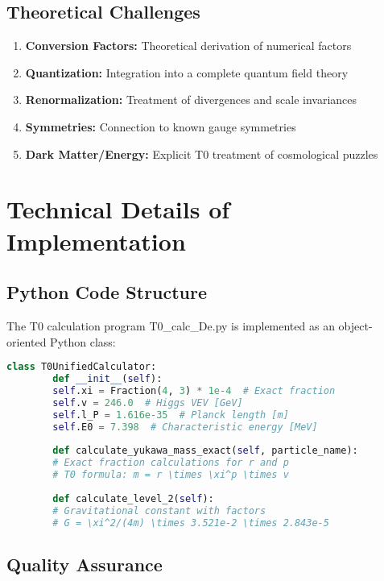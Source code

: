 \documentclass[11pt,a4paper]{article}
\begin{document}
	\subsection{Theoretical Challenges}
	
	\begin{enumerate}
		\item \textbf{Conversion Factors:} Theoretical derivation of numerical factors
		\item \textbf{Quantization:} Integration into a complete quantum field theory
		\item \textbf{Renormalization:} Treatment of divergences and scale invariances
		\item \textbf{Symmetries:} Connection to known gauge symmetries
		\item \textbf{Dark Matter/Energy:} Explicit T0 treatment of cosmological puzzles
	\end{enumerate}
	
	\section{Technical Details of Implementation}
	
	\subsection{Python Code Structure}
	
	The T0 calculation program T0\_calc\_De.py is implemented as an object-oriented Python class:
	
	\begin{lstlisting}[language=Python, basicstyle=\small\ttfamily]
		class T0UnifiedCalculator:
		def __init__(self):
		self.xi = Fraction(4, 3) * 1e-4  # Exact fraction
		self.v = 246.0  # Higgs VEV [GeV]
		self.l_P = 1.616e-35  # Planck length [m]
		self.E0 = 7.398  # Characteristic energy [MeV]
		
		def calculate_yukawa_mass_exact(self, particle_name):
		# Exact fraction calculations for r and p
		# T0 formula: m = r \times \xi^p \times v
		
		def calculate_level_2(self):
		# Gravitational constant with factors
		# G = \xi^2/(4m) \times 3.521e-2 \times 2.843e-5
	\end{lstlisting}
	
	\subsection{Quality Assurance}
	
\end{document}
